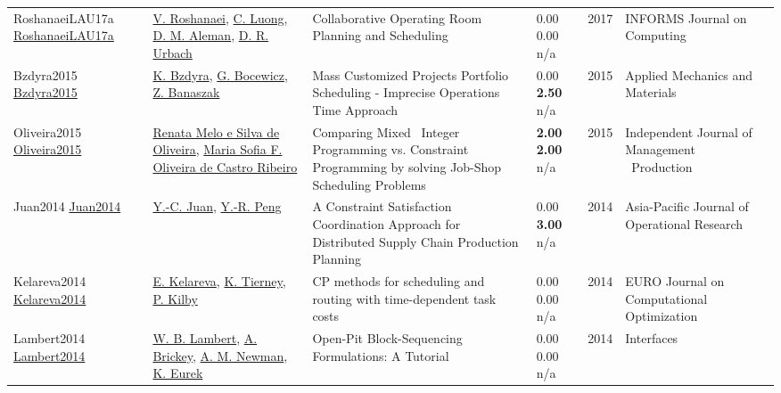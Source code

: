 {\begin{longtable}{p{3cm}p{5cm}p{10cm}p{1cm}rp{2.5cm}l}
RoshanaeiLAU17a \href{http://dx.doi.org/10.1287/ijoc.2017.0745}{RoshanaeiLAU17a} & \hyperref[auth:a727]{V. Roshanaei}, \hyperref[auth:a926]{C. Luong}, \hyperref[auth:a894]{D. M. Aleman}, \hyperref[auth:a895]{D. R. Urbach} & Collaborative Operating Room Planning and Scheduling & \noindent{}\textcolor{black!50}{0.00} \textcolor{black!50}{0.00} n/a & 2017 & \cellcolor{red!20}INFORMS Journal on Computing & \cite{RoshanaeiLAU17a}\\
Bzdyra2015 \href{http://dx.doi.org/10.4028/www.scientific.net/amm.791.70}{Bzdyra2015} & \hyperref[auth:a1810]{K. Bzdyra}, \hyperref[auth:a629]{G. Bocewicz}, \hyperref[auth:a1811]{Z. Banaszak} & Mass Customized Projects Portfolio Scheduling - Imprecise Operations Time Approach & \noindent{}\textcolor{black!50}{0.00} \textbf{2.50} n/a & 2015 & Applied Mechanics and Materials & \cite{Bzdyra2015}\\
Oliveira2015 \href{http://dx.doi.org/10.14807/ijmp.v6i1.262}{Oliveira2015} & \hyperref[auth:a1566]{Renata Melo e Silva de Oliveira}, \hyperref[auth:a1567]{Maria Sofia F. Oliveira de Castro Ribeiro} & Comparing Mixed \  Integer Programming vs. Constraint Programming by solving Job-Shop Scheduling Problems & \noindent{}\textbf{2.00} \textbf{2.00} n/a & 2015 & Independent Journal of Management \  Production & \cite{Oliveira2015}\\
Juan2014 \href{http://dx.doi.org/10.1142/s0217595914500419}{Juan2014} & \hyperref[auth:a1978]{Y.-C. Juan}, \hyperref[auth:a1979]{Y.-R. Peng} & A Constraint Satisfaction Coordination Approach for Distributed Supply Chain Production Planning & \noindent{}\textcolor{black!50}{0.00} \textbf{3.00} n/a & 2014 & Asia-Pacific Journal of Operational Research & \cite{Juan2014}\\
Kelareva2014 \href{http://dx.doi.org/10.1007/s13675-014-0022-7}{Kelareva2014} & \hyperref[auth:a332]{E. Kelareva}, \hyperref[auth:a333]{K. Tierney}, \hyperref[auth:a334]{P. Kilby} & \cellcolor{gold!20}CP methods for scheduling and routing with time-dependent task costs & \noindent{}\textcolor{black!50}{0.00} \textcolor{black!50}{0.00} n/a & 2014 & EURO Journal on Computational Optimization & \cite{Kelareva2014}\\
Lambert2014 \href{http://dx.doi.org/10.1287/inte.2013.0731}{Lambert2014} & \hyperref[auth:a1556]{W. B. Lambert}, \hyperref[auth:a1557]{A. Brickey}, \hyperref[auth:a1558]{A. M. Newman}, \hyperref[auth:a1559]{K. Eurek} & Open-Pit Block-Sequencing Formulations: A Tutorial & \noindent{}\textcolor{black!50}{0.00} \textcolor{black!50}{0.00} n/a & 2014 & \cellcolor{red!20}Interfaces & \cite{Lambert2014}\\

\end{longtable}}
